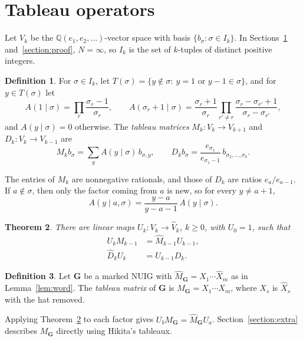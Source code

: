 \documentclass[12pt]{article}
\theoremstyle{plain}
\newtheorem{theorem}{Theorem}
\theoremstyle{definition}
\newtheorem{definition}[theorem]{Definition}
\theoremstyle{remark}
\newcommand{\bQ}{\mathbb{Q}}
\newcommand{\bG}{\mathbf{G}}
\begin{document}
\section{Tableau operators}\label{section:tableau}

Let $V_k$ be the $\bQ(e_1,e_2,\dots)$-vector space with basis $\{b_\sigma:\sigma\in I_k\}$. In Sections~\ref{section:tableau} and~\ref{section:proof}, $N=\infty$, so $I_k$ is the set of $k$-tuples of distinct positive integers.

\begin{definition}
For $\sigma\in I_k$, let $T(\sigma)=\{y\notin\sigma:\ y=1\text{ or }y-1\in\sigma\}$, and for $y\in T(\sigma)$ let
\[
A(1\mid\sigma)=\prod_r\frac{\sigma_r-1}{\sigma_r},\qquad A(\sigma_r+1\mid\sigma)=\frac{\sigma_r+1}{\sigma_r}\prod_{r'\ne r}\frac{\sigma_r-\sigma_{r'}+1}{\sigma_r-\sigma_{r'}},
\]
and $A(y\mid\sigma)=0$ otherwise. The \emph{tableau matrices} $M_k\colon V_k\to V_{k+1}$ and $D_k\colon V_k\to V_{k-1}$ are
\[
M_kb_\sigma=\sum_yA(y\mid\sigma)\,b_{\sigma,y},\qquad D_kb_\sigma=\frac{e_{\sigma_1}}{e_{\sigma_1-1}}\,b_{\sigma_2,\dots,\sigma_k}.
\]
\end{definition}

The entries of $M_k$ are nonnegative rationals, and those of $D_k$ are ratios $e_a/e_{a-1}$. If $a\notin\sigma$, then only the factor coming from $a$ is new, so for every $y\ne a+1$,
\begin{equation}\label{eq:ratio}
A(y\mid a,\sigma)=\frac{y-a}{y-a-1}\,A(y\mid\sigma).
\end{equation}


\begin{theorem}\label{thm:main}
There are linear maps $U_k\colon V_k\to\hat V_k$, $k\ge0$, with $U_0=1$, such that
\begin{align}
U_kM_{k-1}&=\hat M_{k-1}U_{k-1},\tag{M}\label{eq:intertwine-M}\\
\hat D_kU_k&=U_{k-1}D_k.\tag{D}\label{eq:intertwine-D}
\end{align}
\end{theorem}

\begin{definition}\label{def:tableau-matrix}
Let $\bG$ be a marked NUIG with $\hat M_\bG=\hat X_1\cdots\hat X_m$ as in Lemma~\ref{lem:word}. The \emph{tableau matrix} of $\bG$ is $M_\bG=X_1\cdots X_m$, where $X_s$ is $\hat X_s$ with the hat removed.
\end{definition}

Applying Theorem~\ref{thm:main} to each factor gives $U_bM_\bG=\hat M_\bG U_a$. Section~\ref{section:extra} describes $M_\bG$ directly using Hikita's tableaux.
\end{document}
